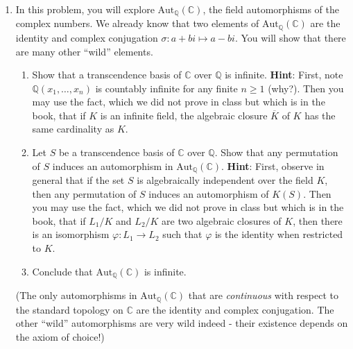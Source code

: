 \documentclass[11pt]{article}
\begin{document}
\begin{enumerate}
\item In this problem, you will explore $\mathrm{Aut}_{\mathbb{Q}}(\mathbb{C})$, the field automorphisms of the complex numbers. We already know that two elements of $\mathrm{Aut}_{\mathbb{Q}}(\mathbb{C})$ are the identity and complex conjugation $\sigma\colon a+bi \mapsto a-bi$. You will show that there are many other ``wild'' elements.
\begin{enumerate}
\item Show that a transcendence basis of $\mathbb{C}$ over $\mathbb{Q}$ is infinite. {\bf Hint}: First, note $\mathbb{Q}(x_1,\ldots,x_n)$ is countably infinite for any finite $n \geq 1$ (why?). Then you may use the fact, which we did not prove in class but which is in the book, that if $K$ is an infinite field, the algebraic closure $\overline{K}$ of $K$ has the same cardinality as $K$.
\item Let $S$ be a transcendence basis of $\mathbb{C}$ over $\mathbb{Q}$. Show that any permutation of $S$ induces an automorphism in $\mathrm{Aut}_{\mathbb{Q}}(\mathbb{C})$. {\bf Hint}: First, observe in general that if the set $S$ is algebraically independent over the field $K$, then any permutation of $S$ induces an automorphism of $K(S)$. Then you may use the fact, which we did not prove in class but which is in the book, that if $L_1/K$ and $L_2/K$ are two algebraic closures of $K$, then there is an isomorphism $\varphi \colon L_1 \to L_2$ such that $\varphi$ is the identity when restricted to $K$.
\item Conclude that $\mathrm{Aut}_{\mathbb{Q}}(\mathbb{C})$ is infinite.
\end{enumerate}
(The only automorphisms in $\mathrm{Aut}_{\mathbb{Q}}(\mathbb{C})$ that are \emph{continuous} with respect to the standard topology on $\mathbb{C}$ are the identity and complex conjugation. The other ``wild'' automorphisms are very wild indeed - their existence depends on the axiom of choice!)

\end{enumerate}
\end{document}
